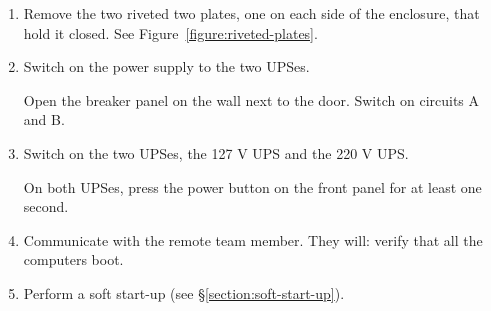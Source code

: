 \begin{enumerate}
    \item
        Remove the two riveted two plates, one on each side of the enclosure, that hold it closed. See Figure~\ref{figure:riveted-plates}.

    \item Switch on the power supply to the two UPSes.

        Open the breaker panel on the wall next to the door. Switch on circuits A and B.

    \item Switch on the two UPSes, the 127 V UPS and the 220 V UPS.

        On both UPSes, press the power button on the front panel for at least one second.

    \item Communicate with the remote team member. They will:
        verify that all the computers boot.

    \item Perform a soft start-up (see \S\ref{section:soft-start-up}).

\end{enumerate}